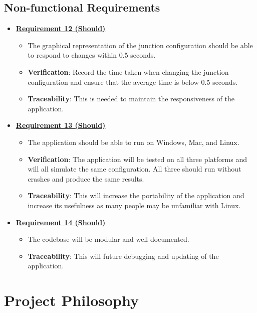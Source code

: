 \documentclass{article}
\begin{document}
\subsection{Non-functional Requirements}
\begin{itemize}
    \item \textbf{\underline{Requirement 12 (Should)}}
    \begin{itemize}
        \item The graphical representation of the junction configuration should be able to respond to changes within 
            0.5 seconds.
        \item \textbf{Verification}: Record the time taken when changing the junction configuration and ensure that 
            the average time is below 0.5 seconds.
        \item\textbf{Traceability}: This is needed to maintain the responsiveness of the application.
    \end{itemize}

    \item \textbf{\underline{Requirement 13 (Should)}}
    \begin{itemize}
        \item The application should be able to run on Windows, Mac, and Linux.
        \item \textbf{Verification}: The application will be tested on all three
             platforms and will all simulate the same configuration. All three should 
             run without crashes and produce the same results. 
        \item\textbf{Traceability}: This will increase the portability of the application 
            and increase its usefulness as many people may be unfamiliar with Linux.
    \end{itemize}

    \item \textbf{\underline{Requirement 14 (Should)}}
    \begin{itemize}
        \item The codebase will be modular and well documented.
        \item\textbf{Traceability}: This will future debugging and updating of the application.
    \end{itemize}
\end{itemize}

\section{Project Philosophy}
\end{document}
